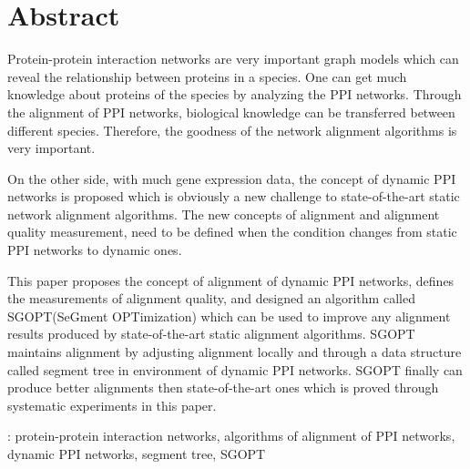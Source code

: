 \chapter*{Abstract}

Protein-protein interaction networks are very important graph models which can reveal the relationship between proteins in a species. One can get much knowledge about proteins of the species by analyzing the PPI networks. Through the alignment of PPI networks, biological knowledge can be transferred between different species. Therefore, the goodness of the network alignment algorithms is very important.

On the other side, with much gene expression data, the concept of dynamic PPI networks is proposed which is obviously a new challenge to state-of-the-art static network alignment algorithms. The new concepts of alignment and alignment quality measurement, need to be defined when the condition changes from static PPI networks to dynamic ones.

This paper proposes the concept of alignment of dynamic PPI networks, defines the measurements of alignment quality, and designed an algorithm called SGOPT(SeGment OPTimization) which can be used to improve any alignment results produced by state-of-the-art static alignment algorithms. SGOPT maintains alignment by adjusting alignment locally and through a data structure called segment tree in environment of dynamic PPI networks. SGOPT finally can produce better alignments then state-of-the-art ones which is proved through systematic experiments in this paper.
\bigskip
\bigskip

: protein-protein interaction networks, algorithms of alignment of PPI networks, dynamic PPI networks, segment tree, SGOPT
